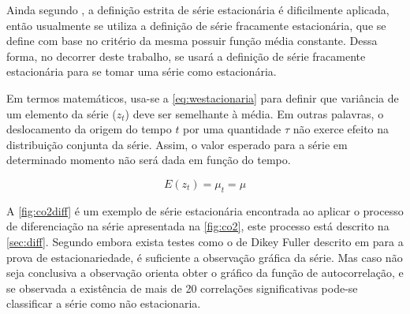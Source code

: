 \documentclass[
    12pt,
    oneside,
    a4paper,
    english,
    brazil
]{abntex2}
\begin{document}
Ainda segundo , a definição  estrita de série estacionária é
dificilmente  aplicada,  então  usualmente  se utiliza  a  definição  de  série
fracamente estacionária,  que se define com  base no critério da  mesma possuir
função média  constante. Dessa forma,  no decorrer  deste trabalho, se  usará a
definição  de  série fracamente  estacionária  para  se  tomar uma  série  como
estacionária.

Em  termos matemáticos,  usa-se a  \autoref{eq:westacionaria} para  definir que
variância  de um  elemento da  série ($z_t$)  deve ser  semelhante à  média. Em
outras  palavras, o  deslocamento da  origem do  tempo $t$  por uma  quantidade
$\tau$ não  exerce efeito  na distribuição  conjunta da  série. Assim,  o valor
esperado para a série em determinado momento não será dada em função do tempo.

\begin{equation}
    \label{eq:westacionaria}
    E(z_t) = \mu_t = \mu
\end{equation}






A  \autoref{fig:co2diff}   é  um  exemplo  de   série  estacionária  encontrada
ao   aplicar   o   processo   de  diferenciação   na   série   apresentada   na
\autoref{fig:co2}, este  processo está descrito na  \autoref{sec:diff}. Segundo
 embora  exista testes  como o  de Dikey  Fuller descrito
em    para  a  prova de  estacionariedade,  é  suficiente  a
observação  gráfica  da  série.  Mas  caso não  seja  conclusiva  a  observação
 orienta obter  o gráfico da função  de autocorrelação, e
se  observada a  existência de  mais de  20 correlações  significativas pode-se
classificar a série como não estacionaria.
\end{document}
